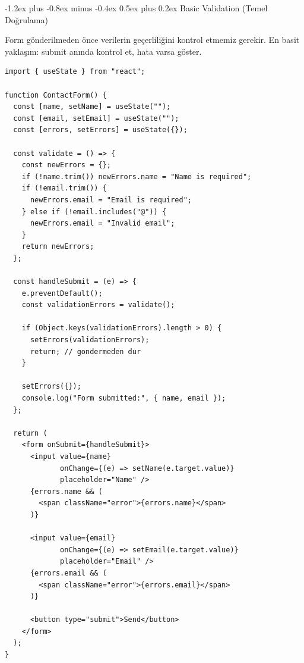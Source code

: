 \documentclass[12pt, a4paper]{article}
\makeatletter
\renewcommand{\subsection}{%
  \@startsection{subsection}{2}{\z@}%
    {-1.2ex plus -0.8ex minus -0.4ex}%
    {0.5ex plus 0.2ex}%
    {\normalfont\large\bfseries\sffamily\color{secondary}}%
}
\makeatother
\begin{document}
\subsection{Basic Validation (Temel Doğrulama)}

Form gönderilmeden önce verilerin geçerliliğini kontrol etmemiz gerekir.
En basit yaklaşım: submit anında kontrol et, hata varsa göster.

\vspace{6pt}

\begin{tcolorbox}[enhanced, colback=codebg, colframe=gray!30,
    colbacktitle=primary!85!black, coltitle=white, arc=4pt,
    title={\sffamily\bfseries\small Temel Validation}]
\begin{lstlisting}[style=jsxstyle]
import { useState } from "react";

function ContactForm() {
  const [name, setName] = useState("");
  const [email, setEmail] = useState("");
  const [errors, setErrors] = useState({});

  const validate = () => {
    const newErrors = {};
    if (!name.trim()) newErrors.name = "Name is required";
    if (!email.trim()) {
      newErrors.email = "Email is required";
    } else if (!email.includes("@")) {
      newErrors.email = "Invalid email";
    }
    return newErrors;
  };

  const handleSubmit = (e) => {
    e.preventDefault();
    const validationErrors = validate();

    if (Object.keys(validationErrors).length > 0) {
      setErrors(validationErrors);
      return; // gondermeden dur
    }

    setErrors({});
    console.log("Form submitted:", { name, email });
  };

  return (
    <form onSubmit={handleSubmit}>
      <input value={name}
             onChange={(e) => setName(e.target.value)}
             placeholder="Name" />
      {errors.name && (
        <span className="error">{errors.name}</span>
      )}

      <input value={email}
             onChange={(e) => setEmail(e.target.value)}
             placeholder="Email" />
      {errors.email && (
        <span className="error">{errors.email}</span>
      )}

      <button type="submit">Send</button>
    </form>
  );
}
\end{lstlisting}
\end{tcolorbox}
\end{document}
